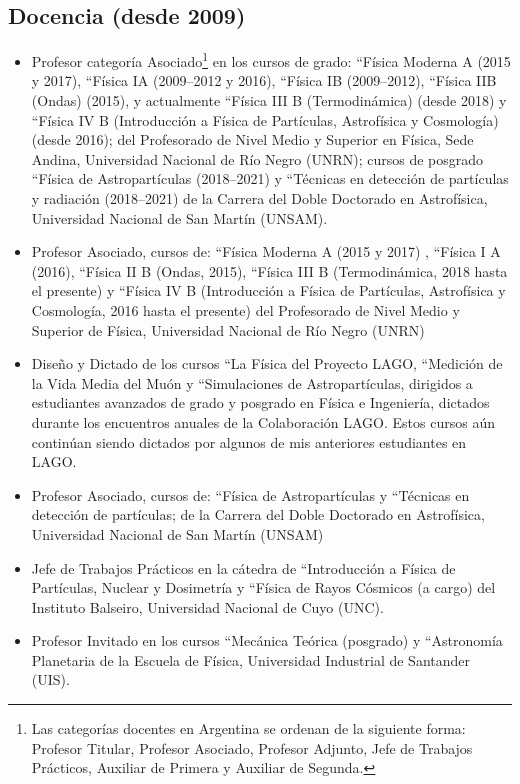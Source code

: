 \subsection*{Docencia (desde 2009)}
\begin{itemize}
\ifres
	\item Profesor categoría Asociado\footnote{Las categorías docentes en Argentina se ordenan de la siguiente forma: Profesor Titular, Profesor Asociado, Profesor Adjunto, Jefe de Trabajos Prácticos, Auxiliar de Primera y Auxiliar de Segunda.} en los cursos de grado: ``Física Moderna A (2015 y 2017), ``Física IA (2009--2012 y 2016), ``Física IB (2009--2012), ``Física IIB (Ondas) (2015), y actualmente ``Física III B (Termodinámica) (desde 2018) y ``Física IV B (Introducción a Física de Partículas, Astrofísica y Cosmología) (desde 2016); del Profesorado de Nivel Medio y Superior en Física, Sede Andina, Universidad Nacional de Río Negro (UNRN); cursos de posgrado ``Física de Astropartículas (2018--2021) y ``Técnicas en detección de partículas y radiación (2018--2021) de la Carrera del Doble Doctorado en Astrofísica, Universidad Nacional de San Martín (UNSAM).
\else
	\item {} Profesor Asociado, cursos de: ``Física Moderna A (2015 y 2017) , ``Física I A (2016), ``Física II B (Ondas, 2015), ``Física III B (Termodinámica, 2018 hasta el presente) y ``Física IV B (Introducción a Física de Partículas, Astrofísica y Cosmología, 2016 hasta el presente) del Profesorado de Nivel Medio y Superior de Física, Universidad Nacional de Río Negro (UNRN)
	\item {} Diseño y Dictado de los cursos ``La Física del Proyecto LAGO, ``Medición de la Vida Media del Muón y ``Simulaciones de Astropartículas, dirigidos a estudiantes avanzados de grado y posgrado en Física e Ingeniería, dictados durante los encuentros anuales de la Colaboración LAGO. Estos cursos aún continúan siendo dictados por algunos de mis anteriores estudiantes en LAGO\@.
	\item {} Profesor Asociado, cursos de: ``Física de Astropartículas y ``Técnicas en detección de partículas;
	de la Carrera del Doble Doctorado en Astrofísica, Universidad Nacional de San Martín (UNSAM)
	\item {} Jefe de Trabajos Prácticos en la cátedra de ``Introducción a Física de Partículas, Nuclear y Dosimetría y ``Física de Rayos Cósmicos (a cargo) del Instituto Balseiro, Universidad Nacional de Cuyo (UNC).
	\item {} Profesor Invitado en los cursos ``Mecánica Teórica (posgrado) y ``Astronomía Planetaria de la Escuela de Física, Universidad Industrial de Santander (UIS).

\end{itemize}

